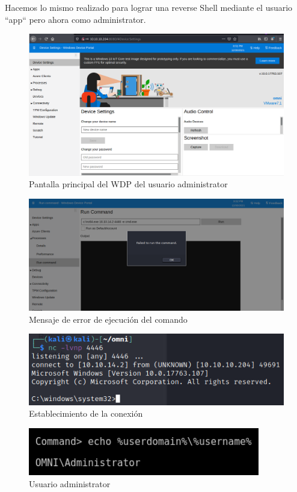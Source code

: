 \documentclass{article}
\begin{document}
Hacemos lo mismo realizado para lograr una reverse Shell mediante el usuario “app“ pero ahora como administrator.
\begin{figure}[H]
	\center
	\includegraphics[width=\textwidth]{images/omni/28.png}
	\caption{Pantalla principal del WDP del usuario administrator}
\end{figure}
\begin{figure}[H]
	\center
	\includegraphics[width=\textwidth]{images/omni/29.png}
	\caption{Mensaje de error de ejecución del comando}
\end{figure}
\begin{figure}[H]
	\center
	\includegraphics[width=\textwidth]{images/omni/30.png}
	\caption{Establecimiento de la conexión}
\end{figure}
\begin{figure}[H]
	\center
	\includegraphics[width=0.9\textwidth]{images/omni/31.png}
	\caption{Usuario administrator}
\end{figure}
\end{document}
